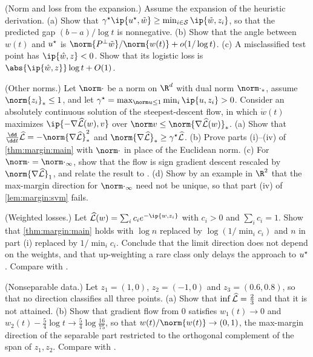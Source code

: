 \begin{refsection}
\begin{exercises}
\item \consolidation (Norm and loss from the expansion.) Assume the expansion of the heuristic derivation. (a) Show that $\gamma^\star\ip{\marginu,\marginwt}\ge\min_{i\in\marginS}\ip{\marginwt,z_i}$, so that the predicted gap $(b-a)/\log t$ is nonnegative. (b) Show that the angle between $w(t)$ and $u^\star$ is $\norm{P^\perp\marginwt}/\norm{w(t)}+o(1/\log t)$. (c) A misclassified test point has $\ip{\marginwhat,z}<0$. Show that its logistic loss is $\abs{\ip{\marginwhat,z}}\log t+O(1)$. \label{ex:margin:expansion}

\item \variation (Other norms.) Let $\norm\cdot$ be a norm on $\R^d$ with dual norm $\norm\cdot_*$, assume $\norm{z_i}_*\le1$, and let $\gamma^\star=\max_{\norm u\le1}\min_i\ip{u,z_i}>0$. Consider an absolutely continuous solution of the steepest-descent flow, in which $\dot w(t)$ maximizes $\ip{-\nabla\Lhat(w),v}$ over $\norm v\le\norm{\nabla\Lhat(w)}_*$. (a) Show that $\frac{\dd}{\dd t}\Lhat=-\norm{\nabla\Lhat}_*^2$ and $\norm{\nabla\Lhat}_*\ge\gamma^\star\Lhat$. (b) Prove parts (i)--(iv) of \cref{thm:margin:main} with $\norm\cdot$ in place of the Euclidean norm. (c) For $\norm\cdot=\norm\cdot_\infty$, show that the flow is sign gradient descent rescaled by $\norm{\nabla\Lhat}_1$, and relate the result to \textcite{ZhangZouCao2024}. (d) Show by an example in $\R^2$ that the max-margin direction for $\norm\cdot_\infty$ need not be unique, so that part (iv) of \cref{lem:margin:svm} fails. \label{ex:margin:norms}

\item \variation (Weighted losses.) Let $\Lhat(w)=\sum_ic_ie^{-\ip{w,z_i}}$ with $c_i>0$ and $\sum_ic_i=1$. Show that \cref{thm:margin:main} holds with $\log n$ replaced by $\log(1/\min_ic_i)$ and $n$ in part (i) replaced by $1/\min_ic_i$. Conclude that the limit direction does not depend on the weights, and that up-weighting a rare class only delays the approach to $u^\star$. Compare with \textcite{ByrdLipton2019}. \label{ex:margin:weights}

\item \variation (Nonseparable data.) Let $z_1=(1,0)$, $z_2=(-1,0)$ and $z_3=(0.6,0.8)$, so that no direction classifies all three points. (a) Show that $\inf\widehat{\mathcal{L}}=\frac23$ and that it is not attained. (b) Show that gradient flow from $0$ satisfies $w_1(t)\to0$ and $w_2(t)-\frac54\log t\to\frac54\log\frac{16}{75}$, so that $w(t)/\norm{w(t)}\to(0,1)$, the max-margin direction of the separable part restricted to the orthogonal complement of the span of $z_1,z_2$. Compare with \textcite{JiTelgarsky2019b}. \label{ex:margin:nonsep}


\end{exercises}
\end{refsection}
